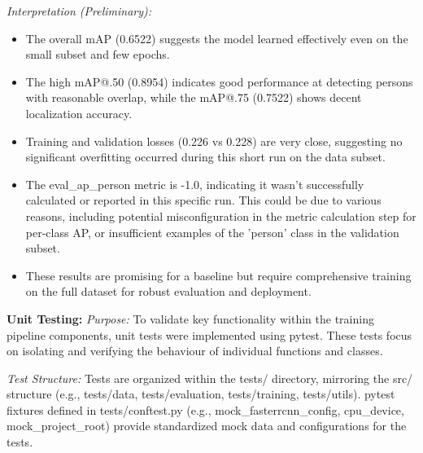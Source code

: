 \textit{Interpretation (Preliminary):}
\begin{itemize}
    \item The overall mAP (0.6522) suggests the model learned effectively even on the small subset and few epochs.
    \item The high mAP@.50 (0.8954) indicates good performance at detecting persons with reasonable overlap, while the mAP@.75 (0.7522) shows decent localization accuracy.
    \item Training and validation losses (0.226 vs 0.228) are very close, suggesting no significant overfitting occurred during this short run on the data subset.
    \item The eval\_ap\_person metric is -1.0, indicating it wasn't successfully calculated or reported in this specific run. This could be due to various reasons, including potential misconfiguration in the metric calculation step for per-class AP, or insufficient examples of the 'person' class in the validation subset.
    \item These results are promising for a baseline but require comprehensive training on the full dataset for robust evaluation and deployment.
\end{itemize}

\textbf{Unit Testing:}
\textit{Purpose:} To validate key functionality within the training pipeline components, unit tests were implemented using pytest. These tests focus on isolating and verifying the behaviour of individual functions and classes.

\textit{Test Structure:} Tests are organized within the tests/ directory, mirroring the src/ structure (e.g., tests/data, tests/evaluation, tests/training, tests/utils). pytest fixtures defined in tests/conftest.py (e.g., mock\_fasterrcnn\_config, cpu\_device, mock\_project\_root) provide standardized mock data and configurations for the tests.

